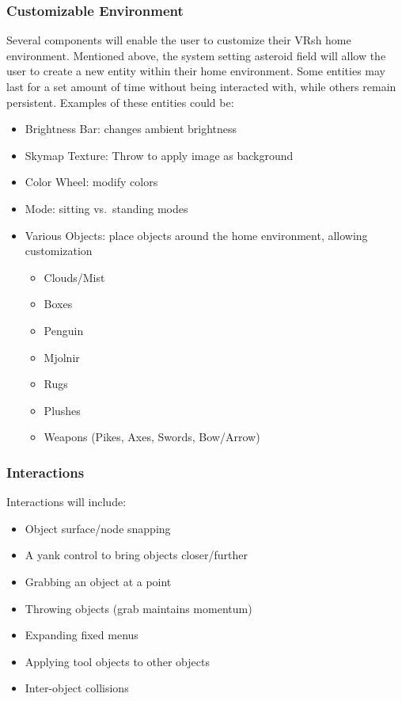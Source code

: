 \documentclass[titlepage,12pt]{article}
\newcommand\name{VRsh}
\begin{document}
\subsubsection{Customizable Environment}\label{sec:env}
Several components will enable the user to customize their {\name} home
environment. Mentioned above, the system setting asteroid field will
allow the user to create a new entity within their home environment.
Some entities may last for a set amount of time without being interacted
with, while others remain persistent. Examples of these entities could be:
\begin{itemize}
    \item Brightness Bar: changes ambient brightness
    \item Skymap Texture: Throw to apply image as background
    \item Color Wheel: modify colors
    \item Mode: sitting vs.\ standing modes
    \item Various Objects: place objects around the home environment, allowing
        customization
        \begin{itemize}
            \item Clouds/Mist
            \item Boxes
            \item Penguin
            \item Mjolnir
            \item Rugs
            \item Plushes
            \item Weapons (Pikes, Axes, Swords, Bow/Arrow)
        \end{itemize}
\end{itemize}

\subsubsection{Interactions}

Interactions will include:
\begin{itemize}
    \item Object surface/node snapping
    \item A yank control to bring objects closer/further
    \item Grabbing an object at a point
    \item Throwing objects (grab maintains momentum)
    \item Expanding fixed menus
    \item Applying tool objects to other objects
    \item Inter-object collisions
\end{itemize}
\end{document}

